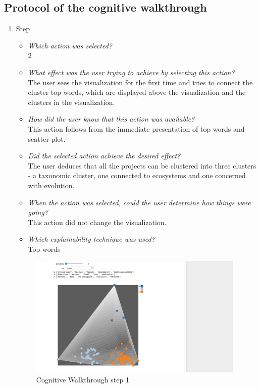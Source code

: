 \subsection{Protocol of the cognitive walkthrough}
{\fontsize{11}{13}\selectfont
	\begin{enumerate}
		\item Step
		\begin{itemize}
			\item \textit{Which action was selected?} \\
			2
			\item \textit{What effect was the user trying to achieve by selecting this action?} \\
			The user sees the visualization for the first time and tries to connect the cluster top words, which are displayed above the visualization and the clusters in the visualization. 
			\item \textit{How did the user know that this action was available?} \\
			This action follows from the immediate presentation of top words and scatter plot. 
			\item \textit{Did the selected action achieve the desired effect?} \\
			The user deduces that all the projects can be clustered into three clusters - a taxonomic cluster, one connected to ecosystems and one concerned with evolution. 
			\item \textit{When the action was selected, could the user determine how things were going?} \\
			This action did not change the visualization.
			\item \textit{Which explainability technique was used?}\\
			Top words
		\end{itemize}
		\begin{figure}[H]
			\centering
			\includegraphics[width=390px]{../chapters/validation/pics/1_c}
			\caption{\label{pic:step1} Cognitive Walkthrough step 1}
		\end{figure} \newpage
		

\end{enumerate}}
